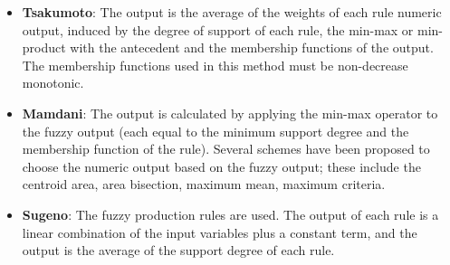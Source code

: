 \begin{itemize} 
\item \textbf{Tsakumoto}: The output is the average of the 
weights of each rule numeric output, induced by the degree of 
support of each rule, the min-max or min-product with the 
antecedent and the membership functions of the output. The 
membership functions used in this method must be 
non-decrease monotonic. 
\item \textbf{Mamdani}: The output is calculated by applying 
the min-max operator to the fuzzy output (each equal to the 
minimum support degree and the membership function of the rule). 
Several schemes have been proposed to choose the numeric output 
based on the fuzzy output; these include the centroid area, 
area bisection, maximum mean, maximum criteria.
\item \textbf{Sugeno}: The fuzzy production rules are used. The 
output of each rule is a linear combination of the input 
variables plus a constant term, and the output is the average 
of the support degree of each rule.
\end{itemize} 


